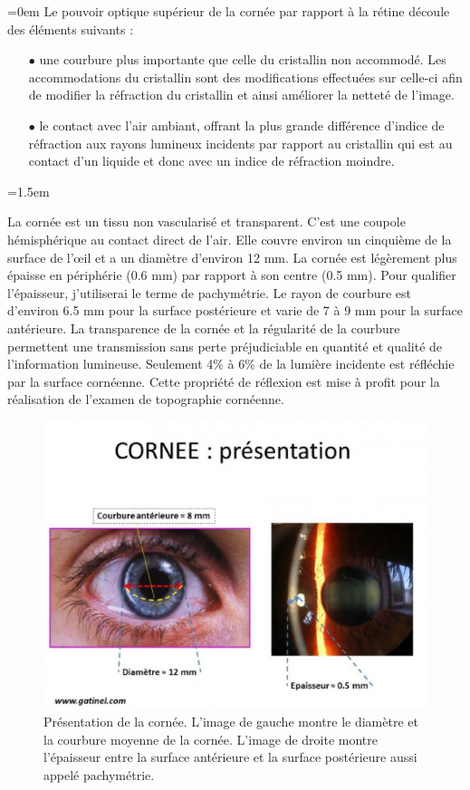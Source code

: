 \documentclass[a4paper,12pt]{article}
\begin{document}
\parindent=0em
Le pouvoir optique supérieur de la cornée par rapport à la rétine découle des éléments suivants : \vspace{0.15cm}
\begin{itemize}\setlength{\itemsep}{1mm}
	\item[$\bullet$] une courbure plus importante que celle du cristallin non accommodé. Les accommodations du cristallin sont des modifications effectuées sur celle-ci afin de modifier la réfraction du cristallin et ainsi améliorer la netteté de l'image.
	\item[$\bullet$] le contact avec l'air ambiant, offrant la plus grande différence d'indice de réfraction aux rayons lumineux incidents par rapport au cristallin qui est au contact d'un liquide et donc avec un indice de réfraction moindre. 
\end{itemize}
\parindent=1.5em

 \vspace{0.5cm}
La cornée est un tissu non vascularisé et transparent. C'est une coupole hémisphérique au contact direct de l'air. Elle couvre environ un cinquième de la surface de l’œil et a un diamètre d'environ 12 mm. La cornée est légèrement plus épaisse en périphérie (0.6 mm) par rapport à son centre (0.5 mm). Pour qualifier l'épaisseur, j'utiliserai le terme de pachymétrie. Le rayon de courbure est d'environ 6.5 mm pour la surface postérieure et varie de 7 à 9 mm pour la surface antérieure. La transparence de la cornée et la régularité de la courbure permettent une transmission sans perte préjudiciable en quantité et qualité de l'information lumineuse. Seulement 4\% à 6\% de la lumière incidente est réfléchie par la surface cornéenne. Cette propriété de réflexion est mise à profit pour la réalisation de l'examen de topographie cornéenne.\cite{gatinel}

\begin{figure}[h]
	\centering
	\includegraphics[width=16cm, trim=0cm 0cm 0cm 3cm, clip]{CorneePresentation.eps} 
	\caption{Présentation de la cornée. L'image de gauche montre le diamètre et la courbure moyenne de la cornée. L'image de droite montre l'épaisseur entre la surface antérieure et la surface postérieure aussi appelé pachymétrie.\cite{gatinel}}
\end{figure}
\end{document}

